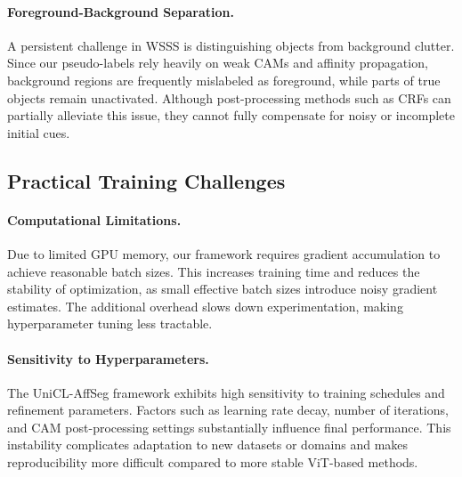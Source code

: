 \paragraph{Foreground-Background Separation.}
A persistent challenge in WSSS is distinguishing objects from background clutter. Since our pseudo-labels rely heavily on weak CAMs and affinity propagation, background regions are frequently mislabeled as foreground, while parts of true objects remain unactivated. Although post-processing methods such as CRFs can partially alleviate this issue, they cannot fully compensate for noisy or incomplete initial cues.

\subsection{Practical Training Challenges}

\paragraph{Computational Limitations.}
Due to limited GPU memory, our framework requires gradient accumulation to achieve reasonable batch sizes. This increases training time and reduces the stability of optimization, as small effective batch sizes introduce noisy gradient estimates. The additional overhead slows down experimentation, making hyperparameter tuning less tractable.

\paragraph{Sensitivity to Hyperparameters.}
The UniCL-AffSeg framework exhibits high sensitivity to training schedules and refinement parameters. Factors such as learning rate decay, number of iterations, and CAM post-processing settings substantially influence final performance. This instability complicates adaptation to new datasets or domains and makes reproducibility more difficult compared to more stable ViT-based methods.

